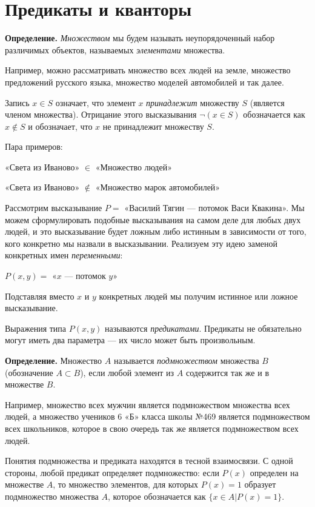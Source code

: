 \section{Предикаты и кванторы}

{\bfseries Определение.} {\slshape Множеством} мы будем называть неупорядоченный набор различимых объектов, называемых {\slshape элементами} множества.

Например, можно рассматривать множество всех людей на земле, множество предложений русского языка, множество моделей автомобилей и так далее.

Запись $x \in S$ означает, что элемент $x$ {\slshape принадлежит} множеству $S$ (является членом множества). Отрицание этого высказывания $\neg (x\in S)$ обозначается как $x\not \in S$ и обозначает, что $x$ не принадлежит множеству $S$.

Пара примеров:

«Света из Иваново» $\in$ «Множество людей»

«Света из Иваново» $\not\in$ «Множество марок автомобилей»

Рассмотрим высказывание $P =$ «Василий Тягин — потомок Васи Квакина». Мы можем сформулировать подобные высказывания на самом деле для любых двух людей, и это высказывание будет ложным либо истинным в зависимости от того, кого конкретно мы назвали в высказывании. Реализуем эту идею заменой конкретных имен {\slshape переменными}:

$P(x, y) = $ «$x$ — потомок $y$»

Подставляя вместо $x$ и $y$ конкретных людей мы получим истинное или ложное высказывание.

Выражения типа $P(x, y)$ называются {\slshape предикатами}. Предикаты не обязательно могут иметь два параметра — их число может быть произвольным.

{\bfseries Определение.} Множество $A$ называется {\slshape подмножеством} множества $B$ (обозначение $A \subset B$), если любой элемент из $A$ содержится так же и в множестве $B$.

Например, множество всех мужчин является подмножеством множества всех людей, а множество учеников 6 «Б» класса школы №469 является подмножеством всех школьников, которое в свою очередь так же является подмножеством всех людей.

Понятия подмножества и предиката находятся в тесной взаимосвязи. С одной стороны, любой предикат определяет подмножество: если $P(x)$ определен на множестве $A$, то множество элементов, для которых $P(x)=1$ образует подмножество множества $A$, которое обозначается как $\{x\in A|P(x)=1\}$.

